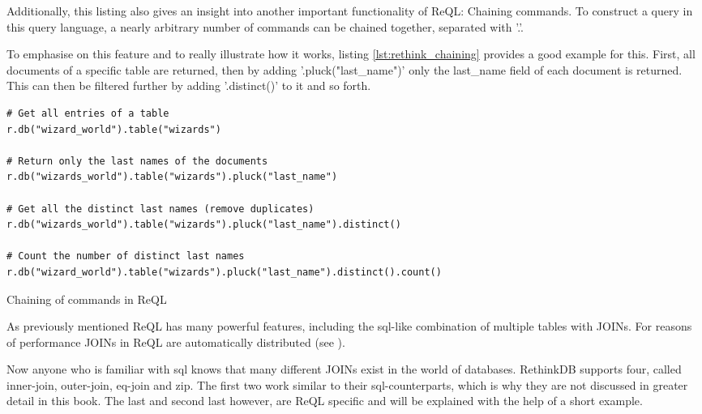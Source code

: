 Additionally, this listing also gives an insight into another important functionality of ReQL: Chaining commands. To construct a query in this query language, a nearly arbitrary number of commands can be chained together, separated with '.'.


To emphasise on this feature and to really illustrate how it works, listing \autoref{lst:rethink_chaining} provides a good example for this. First, all documents of a specific table are returned, then by adding '.pluck("last\_name")' only the last\_name field of each document is returned. This can then be filtered further by adding '.distinct()' to it and so forth.
\begin{listing}[ht]
\begin{verbatim}
# Get all entries of a table
r.db("wizard_world").table("wizards")

# Return only the last names of the documents
r.db("wizards_world").table("wizards").pluck("last_name")

# Get all the distinct last names (remove duplicates)
r.db("wizards_world").table("wizards").pluck("last_name").distinct()

# Count the number of distinct last names
r.db("wizard_world").table("wizards").pluck("last_name").distinct().count()
\end{verbatim}
\caption{Chaining of commands in ReQL}
\label{lst:rethink_chaining}
\end{listing}

As previously mentioned ReQL has many powerful features, including the \gls{sql}-like combination of multiple tables with JOINs. For reasons of performance JOINs in ReQL are automatically distributed (see ).


Now anyone who is familiar with \gls{sql} knows that many different JOINs exist in the world of databases. RethinkDB supports four, called inner-join, outer-join, eq-join and zip. The first two work similar to their \gls{sql}-counterparts, which is why they are not discussed in greater detail in this book. The last and second last however, are ReQL specific and will be explained with the help of a short example.

